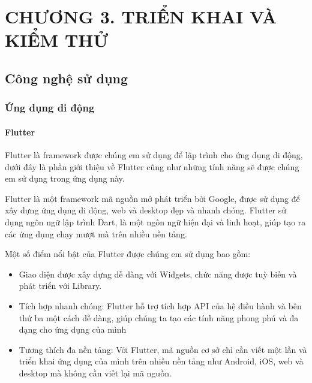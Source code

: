 
\section*{CHƯƠNG 3. TRIỂN KHAI VÀ KIỂM THỬ}
\setcounter{section}{3}
\setcounter{subsection}{0} %
\setcounter{table}{0} %
\setcounter{figure}{0} %

\subsection{Công nghệ sử dụng}
\subsubsection{Ứng dụng di động}

\paragraph{Flutter}
\mbox{}

Flutter là framework được chúng em sử dụng để lập trình cho ứng dụng di động, dưới đây là phần giới thiệu về Flutter cũng
như những tính năng sẽ được chúng em sử dụng trong ứng dụng này.

Flutter là một framework mã nguồn mở phát triển bởi Google, được sử dụng để xây dựng ứng dụng di động, web và desktop đẹp và nhanh chóng. Flutter sử dụng ngôn ngữ lập trình Dart, là một ngôn ngữ hiện đại và linh hoạt, giúp tạo ra các ứng dụng chạy mượt mà trên nhiều nền tảng.

Một số điểm nổi bật của Flutter được chúng em sử dụng bao gồm:

\begin{itemize}
  \item Giao diện được xây dựng dễ dàng với Widgets, chức năng được tuỳ biến và phát triển với Library.
  \item Tích hợp nhanh chóng: Flutter hỗ trợ tích hợp API của hệ điều hành và bên thứ ba một cách dễ dàng, giúp chúng ta tạo các tính năng phong phú và đa dạng cho ứng dụng của mình
  \item Tương thích đa nền tảng: Với Flutter, mã nguồn cơ sở chỉ cần viết một lần và triển khai ứng dụng của mình trên nhiều nền tảng như Android, iOS, web và desktop mà không cần viết lại mã nguồn.
\end{itemize}

